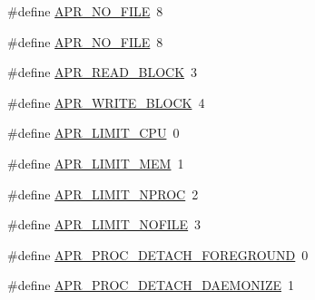 \begin{DoxyCompactItemize}
\item 
\#define \hyperlink{group__apr__thread__proc_ga597fb6a501c20cc3a597fe6c613f4310}{A\+P\+R\+\_\+\+N\+O\+\_\+\+F\+I\+LE}~8
\item 
\#define \hyperlink{group__apr__thread__proc_ga597fb6a501c20cc3a597fe6c613f4310}{A\+P\+R\+\_\+\+N\+O\+\_\+\+F\+I\+LE}~8
\item 
\#define \hyperlink{group__apr__thread__proc_gaf8295548cb0821ee02249d6de8336bcb}{A\+P\+R\+\_\+\+R\+E\+A\+D\+\_\+\+B\+L\+O\+CK}~3
\item 
\#define \hyperlink{group__apr__thread__proc_ga36ff2de9664ad6995bd488b4ac715c9c}{A\+P\+R\+\_\+\+W\+R\+I\+T\+E\+\_\+\+B\+L\+O\+CK}~4
\item 
\#define \hyperlink{group__apr__thread__proc_gaad8a94c7ac2be58fe035b2fd6efec84f}{A\+P\+R\+\_\+\+L\+I\+M\+I\+T\+\_\+\+C\+PU}~0
\item 
\#define \hyperlink{group__apr__thread__proc_ga6dbb01bb357b078acff8fd87e9c494e8}{A\+P\+R\+\_\+\+L\+I\+M\+I\+T\+\_\+\+M\+EM}~1
\item 
\#define \hyperlink{group__apr__thread__proc_ga72e9be453a20f4e78bc6d7bd95d7c333}{A\+P\+R\+\_\+\+L\+I\+M\+I\+T\+\_\+\+N\+P\+R\+OC}~2
\item 
\#define \hyperlink{group__apr__thread__proc_ga18d73099d66988698a9ad2aebdce2c9f}{A\+P\+R\+\_\+\+L\+I\+M\+I\+T\+\_\+\+N\+O\+F\+I\+LE}~3
\item 
\#define \hyperlink{group__apr__thread__proc_gab57b448a464ac299c03d6127781df152}{A\+P\+R\+\_\+\+P\+R\+O\+C\+\_\+\+D\+E\+T\+A\+C\+H\+\_\+\+F\+O\+R\+E\+G\+R\+O\+U\+ND}~0
\item 
\#define \hyperlink{group__apr__thread__proc_gab4de7134fcc66c4127ae65b68631f846}{A\+P\+R\+\_\+\+P\+R\+O\+C\+\_\+\+D\+E\+T\+A\+C\+H\+\_\+\+D\+A\+E\+M\+O\+N\+I\+ZE}~1
\end{DoxyCompactItemize}
